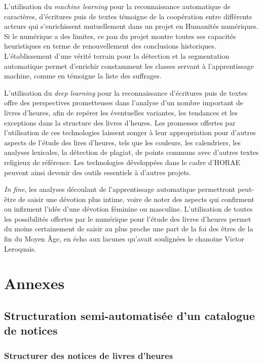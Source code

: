 \documentclass[a4paper,12pt,twoside]{book}
\begin{document}
	L'utilisation du \textit{machine learning} pour la reconnaissance automatique de caractères, d'écritures puis de textes témoigne de la coopération entre différents acteurs qui s'enrichissent mutuellement dans un projet en Humanités numériques. Si le numérique a des limites, ce pan du projet montre toutes ses capacités heuristiques en terme de renouvellement des conclusions historiques. L'établissement d'une vérité terrain pour la détection et la segmentation automatique permet d'enrichir constamment les classes servant à l'apprentissage machine, comme en témoigne la liste des suffrages. 
	
	L'utilisation du \textit{deep learning} pour la reconnaissance d'écritures puis de textes offre des perspectives prometteuses dans l'analyse d'un nombre important de livres d'heures, afin de repérer les éventuelles variantes, les tendances et les exceptions dans la structure des livres d'heures. Les promesses offertes par l'utilisation de ces technologies laissent songer à leur appropriation pour d'autres aspects de l'étude des lires d'heures, tels que les couleurs, les calendriers, les analyses lexicales, la détection de plagiat, de points communs avec d'autres textes religieux de référence. Les technologies développées dans le cadre d'HORAE peuvent ainsi devenir des outils essentiels à d'autres projets. 
	
	\textit{In fine}, les analyses découlant de l'apprentissage automatique permettront peut-être de saisir une dévotion plus intime, voire de noter des aspects qui confirment ou infirment l'idée d'une dévotion féminine ou masculine. L'utilisation de toutes les possibilités offertes par le numérique pour l'étude des livres d'heures permet du moins certainement de saisir au plus proche une part de la foi des êtres de la fin du Moyen Âge, en écho aux lacunes qu'avait soulignées le chanoine Victor Leroquais. 
	
	
	\appendix
	\part*{Annexes}	
	
	\chapter{Structuration semi-automatisée d'un catalogue de notices}
	
	\section{Structurer des notices de livres d'heures}
	
\end{document}
